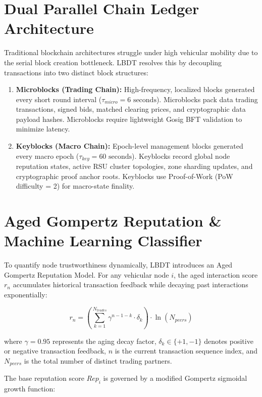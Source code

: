 \section{Dual Parallel Chain Ledger Architecture}\label{sec:method_dual_chain}
\noindent Traditional blockchain architectures struggle under high vehicular mobility due to the serial block creation bottleneck. LBDT resolves this by decoupling transactions into two distinct block structures:

\begin{enumerate}
    \item \textbf{Microblocks (Trading Chain):} High-frequency, localized blocks generated every short round interval ($\tau_{micro} = 6\text{ seconds}$). Microblocks pack data trading transactions, signed bids, matched clearing prices, and cryptographic data payload hashes. Microblocks require lightweight Gosig BFT validation to minimize latency.
    \item \textbf{Keyblocks (Macro Chain):} Epoch-level management blocks generated every macro epoch ($\tau_{key} = 60\text{ seconds}$). Keyblocks record global node reputation states, active RSU cluster topologies, zone sharding updates, and cryptographic proof anchor roots. Keyblocks use Proof-of-Work (PoW difficulty = 2) for macro-state finality.
\end{enumerate}

\section{Aged Gompertz Reputation \& Machine Learning Classifier}\label{sec:method_reputation}
\noindent To quantify node trustworthiness dynamically, LBDT introduces an Aged Gompertz Reputation Model. For any vehicular node $i$, the aged interaction score $r_n$ accumulates historical transaction feedback while decaying past interactions exponentially:

\begin{equation}
r_n = \left( \sum_{k=1}^{N_{trades}} \gamma^{n - 1 - k} \cdot \delta_k \right) \cdot \ln(N_{peers})
\end{equation}

\noindent where $\gamma = 0.95$ represents the aging decay factor, $\delta_k \in \{+1, -1\}$ denotes positive or negative transaction feedback, $n$ is the current transaction sequence index, and $N_{peers}$ is the total number of distinct trading partners.

The base reputation score $Rep_i$ is governed by a modified Gompertz sigmoidal growth function:

